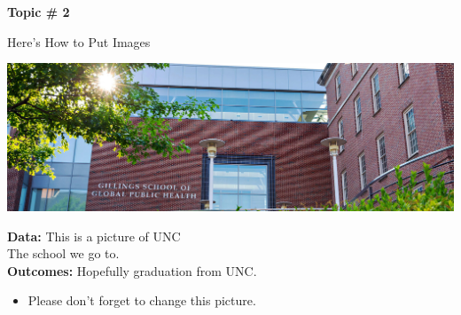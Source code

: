 \documentclass[9pt,aspectratio=169]{beamer}
\begin{document}
{
\begin{frame}
\vspace{1cm}
 \textbf{{\Huge Topic \# 2}}    
\end{frame}
}
\begin{frame}{Here's How to Put Images}
\vspace{2mm}
\begin{center}
    \includegraphics[width=0.9\linewidth]{images/unc.jpeg}
    \end{center}
    \textbf{Data:} \colorbox{ddefblue}{This is a picture of UNC} \\\vspace{1mm} The school we go to. \\\vspace{3mm}
    \textbf{Outcomes:} \colorbox{ddefblue}{Hopefully graduation from UNC.}\\
\begin{itemize}
    \item[\textendash] Please don't forget to change this picture.
\end{itemize}
    
\end{frame}
\end{document}
